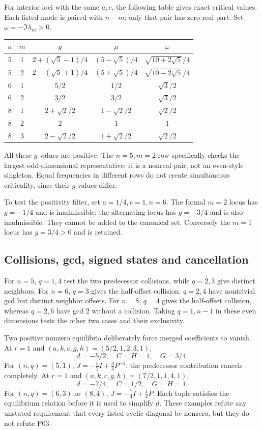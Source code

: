 \documentclass[11pt]{article}
\begin{document}
For interior loci with the same $a,c$, the following table gives exact
critical values. Each listed mode is paired with $n-m$; only that pair has
zero real part. Set $\omega=-\Im\lambda_m>0$.
\begin{center}
\begin{tabular}{ccccc}
\toprule $n$ & $m$ & $g$ & $\mu$ & $\omega$\\\midrule
5 & 1 & $2+(\sqrt5-1)/4$ & $(5-\sqrt5)/4$ & $\sqrt{10+2\sqrt5}/4$\\
5 & 2 & $2-(\sqrt5+1)/4$ & $(5+\sqrt5)/4$ & $\sqrt{10-2\sqrt5}/4$\\
6 & 1 & $5/2$ & $1/2$ & $\sqrt3/2$\\
6 & 2 & $3/2$ & $3/2$ & $\sqrt3/2$\\
8 & 1 & $2+\sqrt2/2$ & $1-\sqrt2/2$ & $\sqrt2/2$\\
8 & 2 & $2$ & $1$ & $1$\\
8 & 3 & $2-\sqrt2/2$ & $1+\sqrt2/2$ & $\sqrt2/2$\\
\bottomrule
\end{tabular}
\end{center}
All these $g$ values are positive. The $n=5,m=2$ row specifically checks
the largest odd-dimensional representative: it is a nonreal pair, not an
even-style singleton. Equal frequencies in different rows do not create
simultaneous criticality, since their $g$ values differ.

To test the positivity filter, set $a=1/4,c=1,n=6$. The formal $m=2$
locus has $g=-1/4$ and is inadmissible; the alternating locus has $g=-3/4$
and is also inadmissible. They cannot be added to the canonical set. Conversely
the $m=1$ locus has $g=3/4>0$ and is retained.

\subsection*{Collisions, gcd, signed states and cancellation}
For $n=5$, $q=1,4$ test the two predecessor collisions, while $q=2,3$
give distinct neighbors. For $n=6$, $q=3$ gives the half-offset collision;
$q=2,4$ have nontrivial gcd but distinct neighbor offsets. For $n=8$,
$q=4$ gives the half-offset collision, whereas $q=2,6$ have gcd $2$
without a collision. Taking $q=1,n-1$ in these even dimensions tests the
other two cases and their exclusivity.

Two positive nonzero equilibria deliberately force merged coefficients to
vanish. At $r=1$ and $(a,k,c,g,h)=(5/2,1,2,3,1)$,
\[
 d=-5/2,\quad C=H=1,\quad G=3/4.
\]
For $(n,q)=(5,1)$, $J=-\tfrac52 I+\tfrac34P^{-1}$: the predecessor
contribution cancels completely. At $r=1$ and
$(a,k,c,g,h)=(7/2,1,1,4,1)$,
\[
 d=-7/4,\quad C=1/2,\quad G=H=1.
\]
For $(n,q)=(6,3)$ or $(8,4)$, $J=-\tfrac74 I+\tfrac12P$.
Each tuple satisfies the equilibrium relation before it is used to simplify
$d$. These examples refute any unstated requirement that every listed
cyclic diagonal be nonzero, but they do not refute P03.
\end{document}
